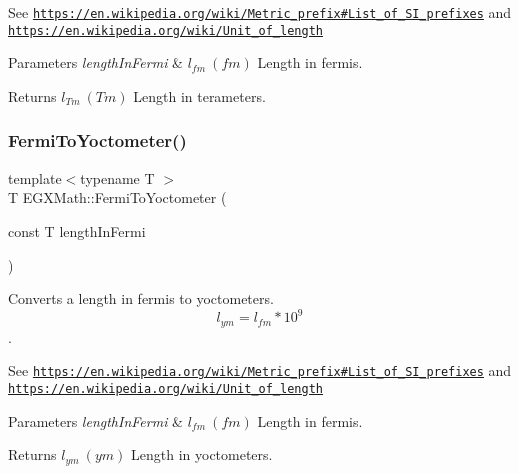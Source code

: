 See \href{https://en.wikipedia.org/wiki/Metric_prefix#List_of_SI_prefixes}{\tt https\+://en.\+wikipedia.\+org/wiki/\+Metric\+\_\+prefix\#\+List\+\_\+of\+\_\+\+S\+I\+\_\+prefixes} and \href{https://en.wikipedia.org/wiki/Unit_of_length}{\tt https\+://en.\+wikipedia.\+org/wiki/\+Unit\+\_\+of\+\_\+length} 
\begin{DoxyParams}{Parameters}
{\em length\+In\+Fermi} & $ l_{fm}\ (fm)$ Length in fermis. \\
\hline
\end{DoxyParams}
\begin{DoxyReturn}{Returns}
$ l_{Tm}\ (Tm)$ Length in terameters. 
\end{DoxyReturn}
\mbox{\label{group___e_g_x_math-_conversions-_length_conversions-_non-_s_i-_fermi-_s_i_gaea7ea589aa3d8270226626bf82c66595}} 
\subsubsection{\texorpdfstring{Fermi\+To\+Yoctometer()}{FermiToYoctometer()}}
{\footnotesize\ttfamily template$<$typename T $>$ \\
T E\+G\+X\+Math\+::\+Fermi\+To\+Yoctometer (\begin{DoxyParamCaption}\item[{const T}]{length\+In\+Fermi }\end{DoxyParamCaption})}



Converts a length in fermis to yoctometers. \[ l_{ym}=l_{fm} * 10^{9} \]. 

See \href{https://en.wikipedia.org/wiki/Metric_prefix#List_of_SI_prefixes}{\tt https\+://en.\+wikipedia.\+org/wiki/\+Metric\+\_\+prefix\#\+List\+\_\+of\+\_\+\+S\+I\+\_\+prefixes} and \href{https://en.wikipedia.org/wiki/Unit_of_length}{\tt https\+://en.\+wikipedia.\+org/wiki/\+Unit\+\_\+of\+\_\+length} 
\begin{DoxyParams}{Parameters}
{\em length\+In\+Fermi} & $ l_{fm}\ (fm)$ Length in fermis. \\
\hline
\end{DoxyParams}
\begin{DoxyReturn}{Returns}
$ l_{ym}\ (ym)$ Length in yoctometers. 
\end{DoxyReturn}
\mbox{\label{group___e_g_x_math-_conversions-_length_conversions-_non-_s_i-_fermi-_s_i_ga1d4accde11444a024a737b2c007dfe26}} 
